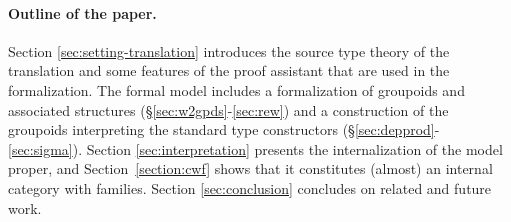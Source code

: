 


\paragraph{\bf Outline of the paper.}
Section \ref{sec:setting-translation} introduces the source type theory
of the translation and some features of the proof assistant that are
used in the formalization. The formal model includes a formalization of
groupoids and associated structures (\S\ref{sec:w2gpds}-\ref{sec:rew})
and a construction of the groupoids interpreting the standard type
constructors (\S\ref{sec:depprod}-\ref{sec:sigma}). Section
\ref{sec:interpretation} presents the internalization of the model
proper, and Section~\ref{section:cwf} shows that it constitutes (almost)
an internal category with families.
% 
 Section \ref{sec:conclusion} concludes on related and future work.
%

